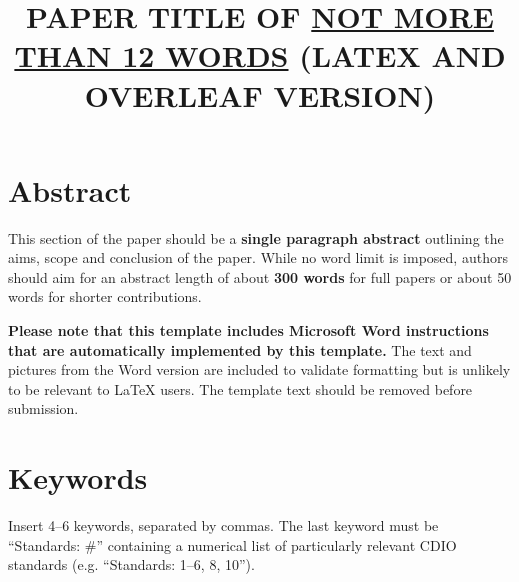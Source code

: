 \documentclass[11pt]{cdio}
\title{PAPER TITLE OF \underline{NOT MORE THAN 12 WORDS} (LATEX AND OVERLEAF VERSION)}
\begin{document}

\section{Abstract}
This section of the paper should be a \textbf{single paragraph abstract}
outlining the aims, scope and conclusion of the paper.
While no word limit is imposed, authors should aim for an abstract length of about \textbf{300 words} for full papers or about 50 words for shorter contributions.

\textbf{Please note that this template includes Microsoft Word instructions that are automatically implemented by this template.}
The text and pictures from the Word version are included to validate formatting but is unlikely to be relevant to \LaTeX{} users.
The template text should be removed before submission.

\section{Keywords}
Insert 4--6 keywords, separated by commas.
The last keyword must be ``Standards: \#'' containing a numerical list of particularly relevant CDIO standards (e.g. ``Standards: 1--6, 8, 10'').

\begin{center}
\end{center}
\end{document}
